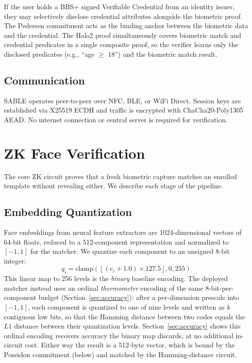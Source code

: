 \documentclass[conference]{IEEEtran}
\begin{document}
If the user holds a BBS+ signed Verifiable Credential from an identity issuer, they may selectively disclose credential attributes alongside the biometric proof. The Pedersen commitment acts as the binding anchor between the biometric data and the credential. The Halo2 proof simultaneously covers biometric match and credential predicates in a single composite proof, so the verifier learns only the disclosed predicates (e.g., ``age $\geq$ 18'') and the biometric match result.

\subsection{Communication}

SABLE operates peer-to-peer over NFC, BLE, or WiFi Direct. Session keys are established via X25519 ECDH and traffic is encrypted with ChaCha20-Poly1305 AEAD. No internet connection or central server is required for verification.

\section{ZK Face Verification}
\label{sec:face-verification}

The core ZK circuit proves that a fresh biometric capture matches an enrolled template without revealing either. We describe each stage of the pipeline.

\subsection{Embedding Quantization}
\label{sec:quantization}

Face embeddings from neural feature extractors are 1024-dimensional vectors of 64-bit floats, reduced to a 512-component representation and normalized to $[-1, 1]$ for the matcher. We quantize each component to an unsigned 8-bit integer:
\begin{equation}
q_i = \text{clamp}\!\left(\left\lfloor (e_i + 1.0) \times 127.5 \right\rfloor, 0, 255\right)
\label{eq:quantize}
\end{equation}
This linear map to 256 levels is the \emph{binary} baseline encoding. The deployed matcher instead uses an ordinal \emph{thermometer} encoding of the same 8-bit-per-component budget (Section~\ref{sec:accuracy}): after a per-dimension prescale into $[-1,1]$, each component is quantized to one of nine levels and written as $k$ contiguous low bits, so that the Hamming distance between two codes equals the $L1$ distance between their quantization levels. Section~\ref{sec:accuracy} shows this ordinal encoding recovers accuracy the binary map discards, at no additional in-circuit cost. Either way the result is a 512-byte vector, which is bound by the Poseidon commitment (below) and matched by the Hamming-distance circuit.
\end{document}
